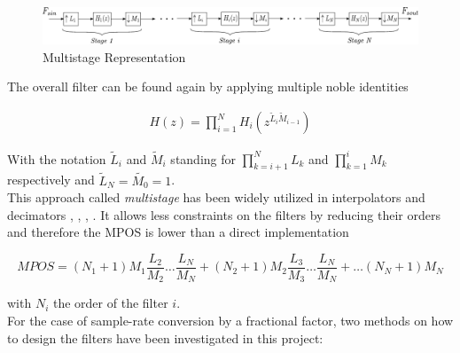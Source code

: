 \begin{figure}[ht!]
	\centering
	\includegraphics[scale = 0.7]{multistage.pdf}
	\caption{Multistage Representation}
	\label{Figure 3.12}
\end{figure}

\newpage
The overall filter can be found again by applying multiple noble identities

\begin{align}
	H(z) = 	\prod_{i=1}^{N} H_i(z^{\tilde{L}_i \tilde{M}_{i-1}})
	\label{eqn:3.24}
\end{align}

With the notation $\tilde{L}_i$ and $\tilde{M}_{i}$ standing for $\prod_{k=i+1}^{N}L_k$ and $\prod_{k=1}^{i}M_k$ respectively and $\tilde{L}_N = \tilde{M_0} = 1$.\\


This approach called \textit{multistage} has been widely utilized in interpolators and decimators \cite{Proakis}, \cite{Oppenheim}, \cite{vaidyanathan}, \cite{turek}. It allows less constraints on the filters by reducing their orders and therefore the MPOS is lower than a direct implementation

\begin{equation}
	MPOS = (N_1 + 1)M_1 \frac{L_2}{M_2}\dots\frac{L_N}{M_N} + (N_2 + 1)M_2 \frac{L_3}{M_3}\dots \frac{L_N}{M_N} + \dots (N_N + 1)M_N 
	\label{eqn:3.25}
\end{equation}

with $N_i$ the order of the filter $i$.\\

For the case of sample-rate conversion by a fractional factor, two methods on how to design the filters have been investigated in this project:

